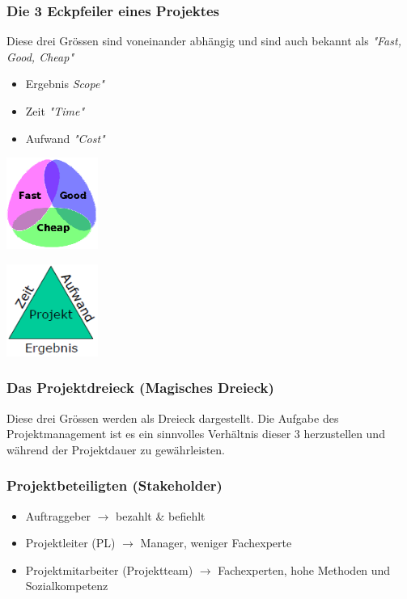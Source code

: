 \subsubsection{Die 3 Eckpfeiler eines Projektes}
\begin{minipage}{10cm}
	Diese drei Grössen sind voneinander abhängig und sind auch bekannt als \textit{"Fast, Good, Cheap"}
	\begin{itemize}
		\item Ergebnis \textit{Scope"}
		\item Zeit \textit{"Time"}
		\item Aufwand \textit{"Cost"}
	\end{itemize}
\end{minipage}
\begin{minipage}{3cm}
	\includegraphics[width=3cm]{images/eckpfeiler.png}
\end{minipage}
\begin{minipage}{3cm}
	\includegraphics[width=3cm]{images/dreieck.png}
\end{minipage}

\subsubsection{Das Projektdreieck (Magisches Dreieck)}
\begin{minipage}{15cm}
	Diese drei Grössen werden als Dreieck dargestellt. Die Aufgabe des Projektmanagement ist es ein sinnvolles Verhältnis dieser 3 herzustellen und während der Projektdauer zu gewährleisten. 
\end{minipage}

\subsubsection{Projektbeteiligten (Stakeholder)}
\begin{itemize}
	\item Auftraggeber $\rightarrow$ bezahlt \& befiehlt
	\item Projektleiter (PL) $\rightarrow$ Manager, weniger Fachexperte
	\item Projektmitarbeiter (Projektteam) $\rightarrow$ Fachexperten, hohe Methoden und Sozialkompetenz
\end{itemize}

